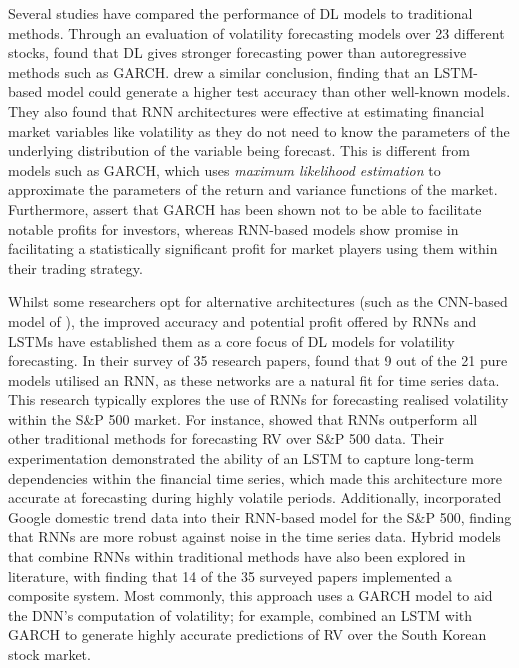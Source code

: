 \documentclass[a4paper, 11pt]{report}
\begin{document}
    Several studies have compared the performance of DL models to traditional methods. Through an evaluation of volatility forecasting models over 23 different stocks, \citet{rahimikia-2020} found that DL gives stronger forecasting power than autoregressive methods such as GARCH. \citet{rodikov-2022} drew a similar conclusion, finding that an LSTM-based model could generate a higher test accuracy than other well-known models. They also found that RNN architectures were effective at estimating financial market variables like volatility as they do not need to know the parameters of the underlying distribution of the variable being forecast. This is different from models such as GARCH, which uses \emph{maximum likelihood estimation} to approximate the parameters of the return and variance functions of the market. Furthermore, \citet{tino-2001} assert that GARCH has been shown not to be able to facilitate notable profits for investors, whereas RNN-based models show promise in facilitating a statistically significant profit for market players using them within their trading strategy. 

    Whilst some researchers opt for alternative architectures (such as the CNN-based model of \citet{chen-2018}), the improved accuracy and potential profit offered by RNNs and LSTMs have established them as a core focus of DL models for volatility forecasting. In their survey of 35 research papers, \citet{ge-2022} found that 9 out of the 21 pure models utilised an RNN, as these networks are a natural fit for time series data. This research typically explores the use of RNNs for forecasting realised volatility within the S\&P 500 market. For instance, \citet{bucci-2020} showed that RNNs outperform all other traditional methods for forecasting RV over S\&P 500 data. Their experimentation demonstrated the ability of an LSTM to capture long-term dependencies within the financial time series, which made this architecture more accurate at forecasting during highly volatile periods. Additionally, \citet{xiong-2016} incorporated Google domestic trend data into their RNN-based model for the S\&P 500, finding that RNNs are more robust against noise in the time series data. Hybrid models that combine RNNs within traditional methods have also been explored in literature, with \citet{ge-2022} finding that 14 of the 35 surveyed papers implemented a composite system. Most commonly, this approach uses a GARCH model to aid the DNN's computation of volatility; for example, \citet{kim-2018} combined an LSTM with GARCH to generate highly accurate predictions of RV over the South Korean stock market.
\end{document}
